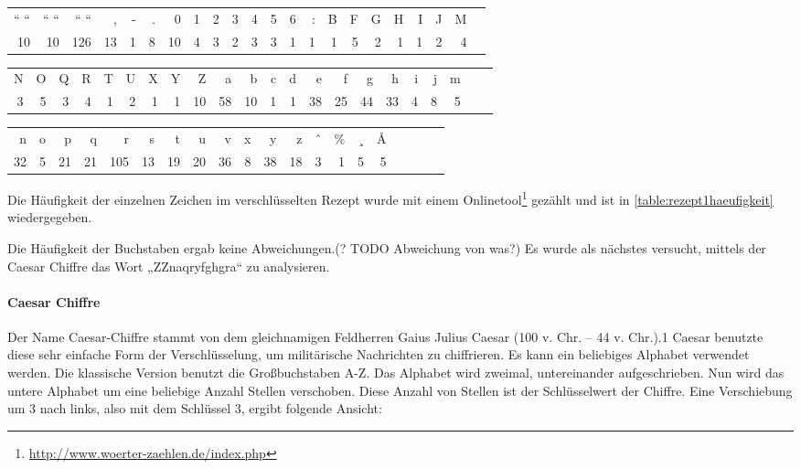 \begin{table}[h]\footnotesize
\begin{tabular}{*{22}{r}}
  `` ``  &  `` ``  &  `` ``  &  ,  &  -  &  .  &  0  &  1  &  2  &  3  &  4  &  5  &  6  &  :  &  B  &  F  &  G  &  H & I & J  &  M \\
  10  &   10  &  126  &   13  &  1  &  8  &   10  &  4  &  3  &  2  &  3  &  3  &  1  &  1  &  1  &  5  &  2  &  1 & 1 & 2 & 4 \\
\end{tabular}

\begin{tabular}{*{22}{r}}
N  &  O  &  Q  &  R  &  T  &  U  &  X  &  Y  &  Z  &  a  &  b  &  c  &  d  &  e  &  f  &  g  &  h  &  i  &  j & m \\
3  &      5  &      3  &      4  &      1  &      2  &      1  &      1  &     10  &     58  &     10  &      1  &      1  &     38  &     25  &     44  &     33  &      4  &      8  &      5 \\
\end{tabular}

\begin{tabular}{*{20}{r}}
n  &  o  &  p  &  q  &  r  &  s  &  t  &  u  &  v  &  x  &  y  &  z  &  ˆ  &  \%  &  ¸  &  Å  \\
32  &      5  &     21  &     21  &    105  &     13  &     19  &     20  &     36  &      8  &     38  &     18  &      3  &      1  &      5  &      5  \\
\end{tabular}
\label{rezept1haeufigkeit}
\end{table}

Die Häufigkeit der einzelnen Zeichen im verschlüsselten Rezept wurde mit einem
Onlinetool\footnote{\url{http://www.woerter-zaehlen.de/index.php}} gezählt und
ist in \cref{table:rezept1haeufigkeit} wiedergegeben.

Die Häufigkeit der Buchstaben ergab keine Abweichungen.(? TODO Abweichung von
was?)  Es wurde als nächstes versucht, mittels der Caesar Chiffre das Wort
„ZZnaqryfghgra“ zu analysieren.

\paragraph{Caesar Chiffre}

Der Name Caesar-Chiffre stammt von dem gleichnamigen Feldherren Gaius Julius
Caesar (100 v. Chr. – 44 v. Chr.).1 Caesar benutzte diese sehr einfache Form der
Verschlüsselung, um militärische Nachrichten zu chiffrieren.  Es kann ein
beliebiges Alphabet verwendet werden. Die klassische Version benutzt die
Großbuchstaben A-Z. Das Alphabet wird zweimal, untereinander aufgeschrieben.
Nun wird das untere Alphabet um eine beliebige Anzahl Stellen verschoben. Diese
Anzahl von Stellen ist der Schlüsselwert der Chiffre. Eine Verschiebung um 3
nach links, also mit dem Schlüssel 3, ergibt folgende Ansicht:

